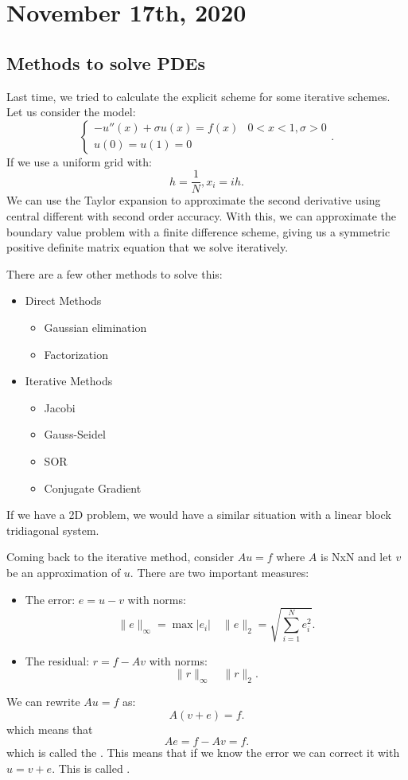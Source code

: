 \documentclass[../main/main.tex]{subfiles}
\begin{document}
\section{November 17th, 2020}
\subsection{Methods to solve PDEs}
Last time, we tried to calculate the explicit scheme for some iterative schemes. Let us consider the model: \[
\begin{cases}
    -u''(x) + \sigma u(x) = f(x) & 0 < x < 1, \sigma > 0\\
    u(0) = u(1) = 0
\end{cases}
.\] 
If we use a uniform grid with: \[
h = \frac{1}{N}, x_i = ih
.\] We can use the Taylor expansion to approximate the second derivative using central different with second order accuracy. With this, we can approximate the boundary value problem with a finite difference scheme, giving us a symmetric positive definite matrix equation that we solve iteratively. 

There are a few other methods to solve this: 
\begin{itemize}
    \item Direct Methods
        \begin{itemize}
            \item Gaussian elimination
            \item Factorization
        \end{itemize}
    \item Iterative Methods
        \begin{itemize}
            \item Jacobi
            \item Gauss-Seidel
            \item SOR
            \item Conjugate Gradient
        \end{itemize}
\end{itemize}

If we have a 2D problem, we would have a similar situation with a linear block tridiagonal system.  

Coming back to the iterative method, consider $Au=f$ where $A$ is NxN and let $v$ be an approximation of $u$. There are two important measures: 
\begin{itemize}
    \item The error: $e=u-v$ with norms: \[
    \|e\|_\infty = \max |e_i| \quad \|e\|_2 = \sqrt{\sum_{i=1}^{N} e_i^2} 
    .\] 
\item The residual: $r=f-Av$ with norms: \[
\|r\|_\infty \quad \|r\|_2
.\] 
\end{itemize}
We can rewrite $Au=f$ as: \[
    A(v+e) = f
.\] which means that \[
Ae = f - Av = f
.\] which is called the . This means that if we know the error we can correct it with $u=v+e$. This is called .
\end{document}
